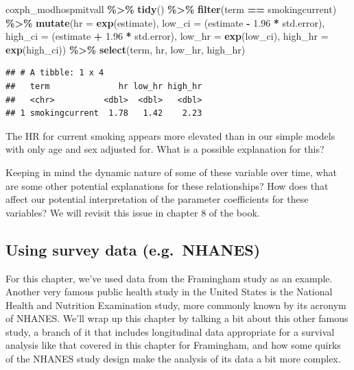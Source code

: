 \documentclass[
]{book}
\newenvironment{Shaded}{\begin{snugshade}}{\end{snugshade}}
\newcommand{\AttributeTok}[1]{\textcolor[rgb]{0.13,0.29,0.53}{#1}}
\newcommand{\FloatTok}[1]{\textcolor[rgb]{0.00,0.00,0.81}{#1}}
\newcommand{\FunctionTok}[1]{\textcolor[rgb]{0.13,0.29,0.53}{\textbf{#1}}}
\newcommand{\NormalTok}[1]{#1}
\newcommand{\SpecialCharTok}[1]{\textcolor[rgb]{0.81,0.36,0.00}{\textbf{#1}}}
\newcommand{\StringTok}[1]{\textcolor[rgb]{0.31,0.60,0.02}{#1}}
\begin{document}
\begin{Shaded}
\begin{Highlighting}[]
\NormalTok{coxph\_modhospmitvall }\SpecialCharTok{\%\textgreater{}\%} 
  \FunctionTok{tidy}\NormalTok{() }\SpecialCharTok{\%\textgreater{}\%} 
  \FunctionTok{filter}\NormalTok{(term }\SpecialCharTok{==} \StringTok{\textquotesingle{}smokingcurrent\textquotesingle{}}\NormalTok{) }\SpecialCharTok{\%\textgreater{}\%}
  \FunctionTok{mutate}\NormalTok{(}\AttributeTok{hr =} \FunctionTok{exp}\NormalTok{(estimate),}
         \AttributeTok{low\_ci =}\NormalTok{ (estimate }\SpecialCharTok{{-}} \FloatTok{1.96} \SpecialCharTok{*}\NormalTok{ std.error), }
         \AttributeTok{high\_ci =}\NormalTok{ (estimate }\SpecialCharTok{+} \FloatTok{1.96} \SpecialCharTok{*}\NormalTok{ std.error), }
         \AttributeTok{low\_hr =} \FunctionTok{exp}\NormalTok{(low\_ci), }
         \AttributeTok{high\_hr =} \FunctionTok{exp}\NormalTok{(high\_ci)) }\SpecialCharTok{\%\textgreater{}\%} 
  \FunctionTok{select}\NormalTok{(term, hr, low\_hr, high\_hr)}
\end{Highlighting}
\end{Shaded}

\begin{verbatim}
## # A tibble: 1 x 4
##   term              hr low_hr high_hr
##   <chr>          <dbl>  <dbl>   <dbl>
## 1 smokingcurrent  1.78   1.42    2.23
\end{verbatim}

The HR for current smoking appears more elevated than in our simple models with only age and sex adjusted for. What is a possible explanation for this?

Keeping in mind the dynamic nature of some of these variable over time, what are some other potential explanations for these relationships? How does that affect our potential interpretation of the parameter coefficients for these variables? We will revisit this issue in chapter 8 of the book.

\subsection{Using survey data (e.g.~NHANES)}\label{using-survey-data-e.g.-nhanes}

For this chapter, we've used data from the Framingham study as an example. Another very famous public health study in the United States is the National Health and Nutrition Examination study, more commonly known by its acronym of NHANES. We'll wrap up this chapter by talking a bit about this other famous study, a branch of it that includes longitudinal data appropriate for a survival analysis like that covered in this chapter for Framingham, and how some quirks of the NHANES study design make the analysis of its data a bit more complex.
\end{document}

